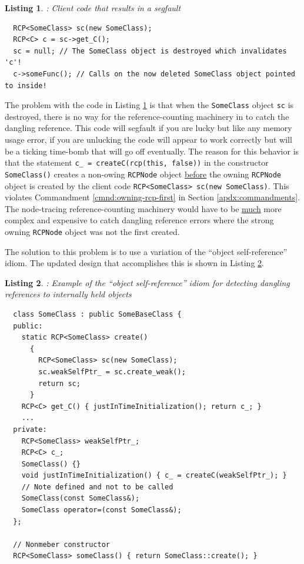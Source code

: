 \documentclass[pdf,ps2pdf,11pt]{SANDreport}
\newtheorem{listing}{Listing}
\begin{document}
\begin{listing}: Client code that results in a segfault  \\
\label{listing:osr:bad-use-SomeClass}
{\small\begin{verbatim}
  RCP<SomeClass> sc(new SomeClass);
  RCP<C> c = sc->get_C();
  sc = null; // The SomeClass object is destroyed which invalidates 'c'!
  c->someFunc(); // Calls on the now deleted SomeClass object pointed to inside!
\end{verbatim}}
\end{listing}


The problem with the code in Listing
{}\ref{listing:osr:bad-use-SomeClass} is that when the
{}\texttt{SomeClass} object {}\texttt{sc} is destroyed, there is no
way for the reference-counting machinery in to catch the dangling
reference.  This code will segfault if you are lucky but like any
memory usage error, if you are unlucking the code will appear to work
correctly but will be a ticking time-bomb that will go off eventually.
The reason for this behavior is that the statement {}\texttt{c\_ =
createC(rcp(this, false))} in the constructor {}\texttt{SomeClass()}
creates a non-owing {}\texttt{RCPNode} object {}\underline{before} the
owning {}\texttt{RCPNode} object is created by the client code
{}\texttt{RCP<SomeClass> sc(new SomeClass)}.  This violates
Commandment {}\ref{cmnd:owning-rcp-first} in Section
{}\ref{apdx:commandments}.  The node-tracing reference-counting
machinery would have to be {}\underline{much} more complex and
expensive to catch dangling reference errors where the strong owning
{}\texttt{RCPNode} object was not the first created.

The solution to this problem is to use a variation of the ``object
self-reference'' idiom.  The updated design that accomplishes this is
shown in Listing {}\ref{listing:osr:SomeClass-refactored}.


\begin{listing}:  Example of the ``object self-reference'' idiom for
detecting dangling references to internally held objects  \\
\label{listing:osr:SomeClass-refactored}
{\small\begin{verbatim}
  class SomeClass : public SomeBaseClass {
  public:
    static RCP<SomeClass> create()
      {
        RCP<SomeClass> sc(new SomeClass);
        sc.weakSelfPtr_ = sc.create_weak();
        return sc;
      }
    RCP<C> get_C() { justInTimeInitialization(); return c_; }
    ...
  private:
    RCP<SomeClass> weakSelfPtr_;
    RCP<C> c_;
    SomeClass() {}
    void justInTimeInitialization() { c_ = createC(weakSelfPtr_); }
    // Note defined and not to be called
    SomeClass(const SomeClass&);
    SomeClass operator=(const SomeClass&);
  };

  // Nonmeber constructor
  RCP<SomeClass> someClass() { return SomeClass::create(); }
\end{verbatim}}
\end{listing}
\end{document}
